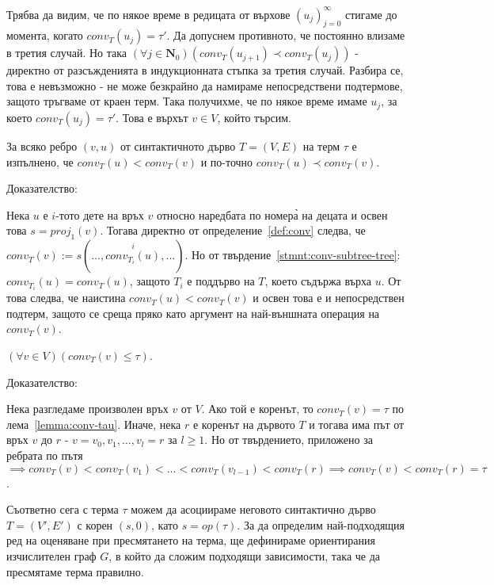 \documentclass[12pt,twoside,a4paper]{article}
\begin{document}
\begin{statement}
		Трябва да видим, че по някое време в редицата от върхове $(u_j)_{j=0}^\infty$ стигаме до момента, когато $conv_T(u_j) = \tau'$. Да допуснем противното, че постоянно влизаме в третия случай. Но така $(\forall j \in \mathbf{N}_0)(conv_T(u_{j+1}) \prec conv_T(u_j))$ - директно от разсъжденията в индукционната стъпка за третия случай. Разбира се, това е невъзможно - не може безкрайно да намираме непосредствени подтермове, защото тръгваме от краен терм. Така получихме, че по някое време имаме $u_j$, за което $conv_T(u_j) = \tau'$. Това е върхът $v \in V$, който търсим.
	\end{statement}
	
	\newpage
	\begin{statement}\label{stmnt:tree-subterms} За всяко ребро $(v,u)$ от синтактичното дърво $T=(V,E)$ на терм $\tau$ е изпълнено, че $conv_T(u) < conv_T(v)$ и по-точно $conv_T(u) \prec conv_T(v)$.
		
		\noindent Доказателство:
		
		Нека $u$ е $i$-тото дете на връх $v$ относно наредбата по номера̀ на децата и освен това $s = proj_1(v)$. Тогава директно от определение~\ref{def:conv} следва, че $conv_T(v):=s(\dots, \overset{i}{conv_{T_i}(u)}, \dots)$. Но от твърдение~\ref{stmnt:conv-subtree-tree}: $conv_{T_i}(u) = conv_T(u)$, защото $T_i$ е поддърво на $T$, което съдържа върха $u$. От това следва, че наистина $conv_T(u) < conv_T(v)$ и освен това е и непосредствен подтерм, защото се среща пряко като аргумент на най-външната операция на $conv_T(v)$.
	\end{statement}
	
	\begin{corollary}\label{cor:tree-path} $(\forall v \in V)(conv_T(v) \leq \tau)$.
		
		\noindent Доказателство:
		
		\indent Нека разгледаме произволен връх $v$ от $V$. Ако той е коренът, то $conv_T(v) = \tau$ по лема~\ref{lemma:conv-tau}. Иначе, нека $r$ е коренът на дървото $T$ и тогава има път от връх $v$ до $r$ - $v = v_0, v_1, \dots, v_l = r$ за $l \ge 1$. Но от твърдението, приложено за ребрата по пътя $\implies conv_T(v) < conv_T(v_1) < \dots < conv_T(v_{l-1}) < conv_T(r) \implies conv_T(v) < conv_T(r) = \tau$.
	\end{corollary}
	
	Съответно сега с терма $\tau$ можем да асоциираме неговото синтактично дърво $T=(V',E')$ с корен $(s, 0)$, като $s = op(\tau)$. За да определим най-подходящия ред на оценяване при пресмятането на терма, ще дефинираме ориентирания изчислителен граф $G$, в който да сложим подходящи зависимости, така че да пресмятаме терма правилно.
	
\end{document}

